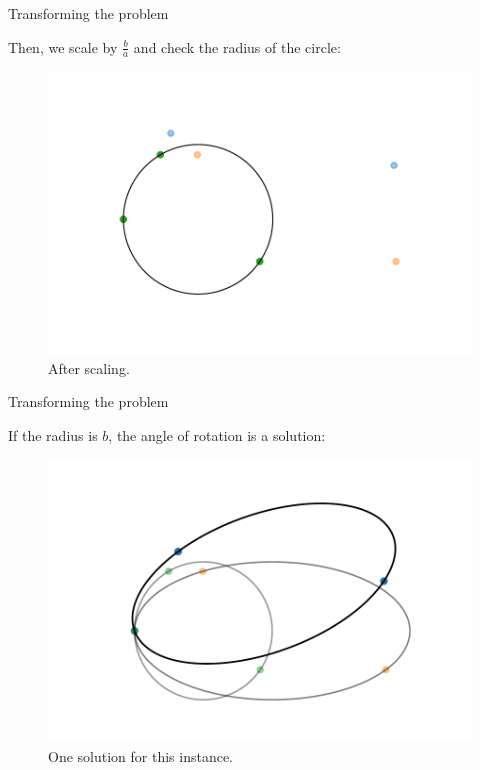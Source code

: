 \documentclass{beamer}
\begin{document}
\begin{frame}{Transforming the problem}
	
	Then, we scale by $\frac{b}{a}$ and check the radius of the circle:
	
	\begin{figure}
		\centering
		\includegraphics[scale=.5]{sol3}
		\caption{After scaling.}
		\label{fig:sol33}
	\end{figure}
\end{frame}

\begin{frame}{Transforming the problem}
	
	If the radius is $b$, the angle of rotation is a solution:
	
	\begin{figure}
		\centering
		\includegraphics[scale=.5]{sol4}
		\caption{One solution for this instance.}
		\label{fig:sol4}
	\end{figure}
\end{frame}
\end{document}
